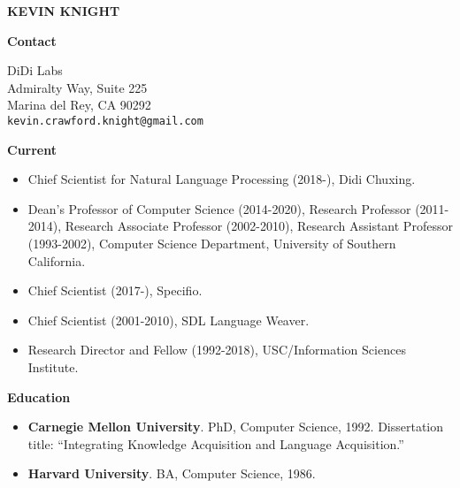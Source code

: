 

\newcommand{\hd}[1]{
\vspace*{0.2in} 
\noindent 
{\bf \Large #1}
\vspace*{0.1in} 
}

\pagestyle{plain}


\begin{center}
{\Large \bf KEVIN KNIGHT} \\
\end{center}

\vspace{0.2in}

\hd{Contact}

\bigskip

DiDi Labs \\
 Admiralty Way, Suite 225 \\
\indent
Marina del Rey, CA 90292 \\
\indent
\verb+kevin.crawford.knight@gmail.com+ 


\hd{Current}

\begin{itemize}
\item Chief Scientist for Natural Language Processing (2018-), Didi Chuxing.

\item Dean's Professor of Computer Science (2014-2020), 
Research Professor (2011-2014), 
Research Associate Professor (2002-2010),
Research Assistant Professor (1993-2002), 
Computer Science Department, 
University of Southern California.  

\item Chief Scientist (2017-), Specifio.

\item Chief Scientist (2001-2010), SDL Language Weaver.

\item Research Director and Fellow (1992-2018),
USC/Information Sciences Institute.
\end{itemize}


\hd{Education}

\begin{itemize}
\item {\bf Carnegie Mellon University}.  PhD, Computer Science, 1992.
Dissertation title: ``Integrating Knowledge Acquisition and Language Acquisition.''

\item {\bf Harvard University}.  BA, Computer Science, 1986.

\end{itemize}


